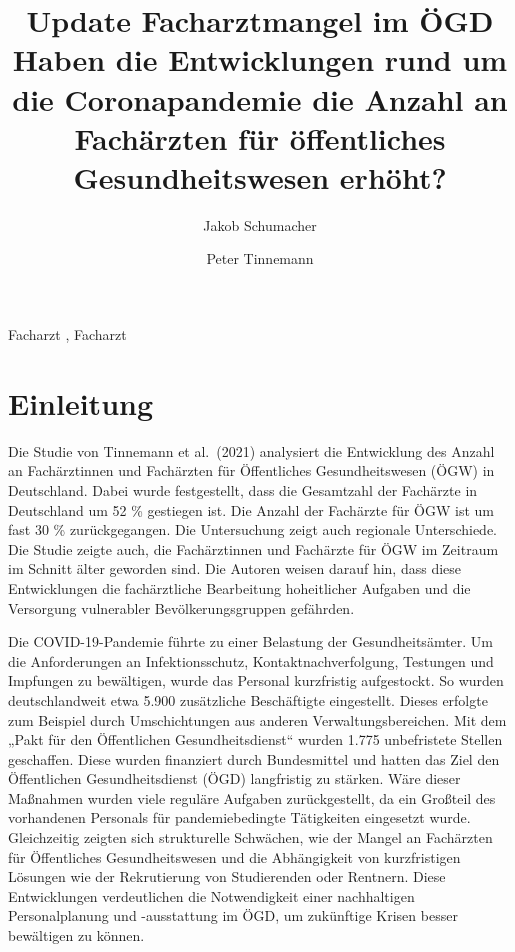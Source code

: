 \documentclass[
  ngerman,
  number,
  preprint,
  3p,
  twocolumn]{elsarticle}
\begin{document}
\begin{frontmatter}
\title{Update Facharztmangel im ÖGD \\\large{Haben die Entwicklungen
rund um die Coronapandemie die Anzahl an Fachärzten für öffentliches
Gesundheitswesen erhöht?} }
\author[1]{Jakob Schumacher%
%
}
\author[2]{Peter Tinnemann%
%
}





        





\begin{keyword}
    Facharzt \sep 
    Facharzt
\end{keyword}
\end{frontmatter}
    

\section{Einleitung}\label{einleitung}

Die Studie von Tinnemann et al.~(2021) analysiert die Entwicklung des
Anzahl an Fachärztinnen und Fachärzten für Öffentliches Gesundheitswesen
(ÖGW) in Deutschland. Dabei wurde festgestellt, dass die Gesamtzahl der
Fachärzte in Deutschland um 52 \% gestiegen ist. Die Anzahl der
Fachärzte für ÖGW ist um fast 30 \% zurückgegangen. Die Untersuchung
zeigt auch regionale Unterschiede. Die Studie zeigte auch, die
Fachärztinnen und Fachärzte für ÖGW im Zeitraum im Schnitt älter
geworden sind. Die Autoren weisen darauf hin, dass diese Entwicklungen
die fachärztliche Bearbeitung hoheitlicher Aufgaben und die Versorgung
vulnerabler Bevölkerungsgruppen gefährden.

Die COVID-19-Pandemie führte zu einer Belastung der Gesundheitsämter. Um
die Anforderungen an Infektionsschutz, Kontaktnachverfolgung, Testungen
und Impfungen zu bewältigen, wurde das Personal kurzfristig aufgestockt.
So wurden deutschlandweit etwa 5.900 zusätzliche Beschäftigte
eingestellt. Dieses erfolgte zum Beispiel durch Umschichtungen aus
anderen Verwaltungsbereichen. Mit dem „Pakt für den Öffentlichen
Gesundheitsdienst`` wurden 1.775 unbefristete Stellen geschaffen. Diese
wurden finanziert durch Bundesmittel und hatten das Ziel den
Öffentlichen Gesundheitsdienst (ÖGD) langfristig zu stärken. Wäre dieser
Maßnahmen wurden viele reguläre Aufgaben zurückgestellt, da ein Großteil
des vorhandenen Personals für pandemiebedingte Tätigkeiten eingesetzt
wurde. Gleichzeitig zeigten sich strukturelle Schwächen, wie der Mangel
an Fachärzten für Öffentliches Gesundheitswesen und die Abhängigkeit von
kurzfristigen Lösungen wie der Rekrutierung von Studierenden oder
Rentnern. Diese Entwicklungen verdeutlichen die Notwendigkeit einer
nachhaltigen Personalplanung und -ausstattung im ÖGD, um zukünftige
Krisen besser bewältigen zu können.
\end{document}
